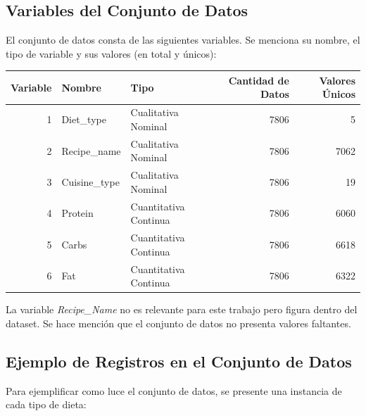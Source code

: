 \documentclass[12pt,a4paper]{article}
\begin{document}
{        \subsection{Variables del Conjunto de Datos}
        {
            El conjunto de datos consta de las siguientes variables. Se menciona su 
            nombre, el tipo de variable y sus valores (en total y únicos):
            
            \begin{center}
                \begin{tabular}{r|llrr}
                    \toprule
                    Variable & Nombre & Tipo & Cantidad de Datos & Valores Únicos\\
                    \midrule
                    1 & Diet\_type & Cualitativa Nominal & 7806 & 5 \\
                    2 & Recipe\_name & Cualitativa Nominal & 7806 & 7062\\
                    3 & Cuisine\_type & Cualitativa Nominal & 7806 & 19\\
                    4 & Protein & Cuantitativa Continua & 7806 & 6060\\
                    5 & Carbs & Cuantitativa Continua & 7806 & 6618\\
                    6 & Fat & Cuantitativa Continua & 7806 & 6322\\
                    \bottomrule
                \end{tabular}
            \end{center}
            
            La variable \emph{Recipe\_Name} no es relevante para este trabajo pero figura 
            dentro del dataset. Se hace mención que el conjunto de datos no presenta 
            valores faltantes.
        }

        \subsection{Ejemplo de Registros en el Conjunto de Datos}\label{subsec:ejemplos}
        {
            Para ejemplificar como luce el conjunto de datos, se presente 
            una instancia de cada tipo de dieta:
            
}}
\end{document}
